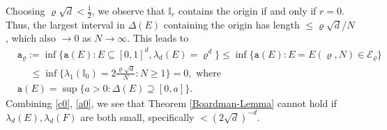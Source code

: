 \documentclass[a4paper,11pt]{amsart}
\numberwithin{equation}{section}
\begin{document}
Choosing $\varrho \sqrt{d} < \frac{1}{2}$, we observe that $\mathbb I_r$ contains the origin if and only if $r = 0$. Thus, the largest interval in $\Delta(E)$ containing the origin has length $\leq \varrho \sqrt{d}/N$, which also $\rightarrow 0$ as $N \rightarrow \infty$. This leads to  
\begin{align} 
&\mathtt a_{\varrho} := \inf \bigl\{ \mathtt a(E) : E \subseteq [0,1]^d, \lambda_d(E) = \varrho^d  \bigr\} \leq \inf \bigl\{ \mathtt a(E) : E = E(\varrho, N) \in \mathscr{E}_{\varrho}\bigr\} \nonumber \\ &\quad \; \leq \inf \bigl\{ \lambda_1(\mathbb I_0) = 2\frac{\varrho \sqrt{d}}{N} : N \geq 1\bigr\} = 0, \text{ where } \label{a0}\\ 
&\mathtt a(E) = \sup \bigl\{a > 0 : \Delta(E) \supseteq [0, a] \bigr\}. \nonumber 
\end{align} 
Combining \eqref{c0}, \eqref{a0}, we see that Theorem \ref{Boardman-Lemma} cannot hold if $\lambda_d(E), \lambda_d(F)$ are both small, specifically $< (2 \sqrt{d})^{-d}$. 
\end{document}
